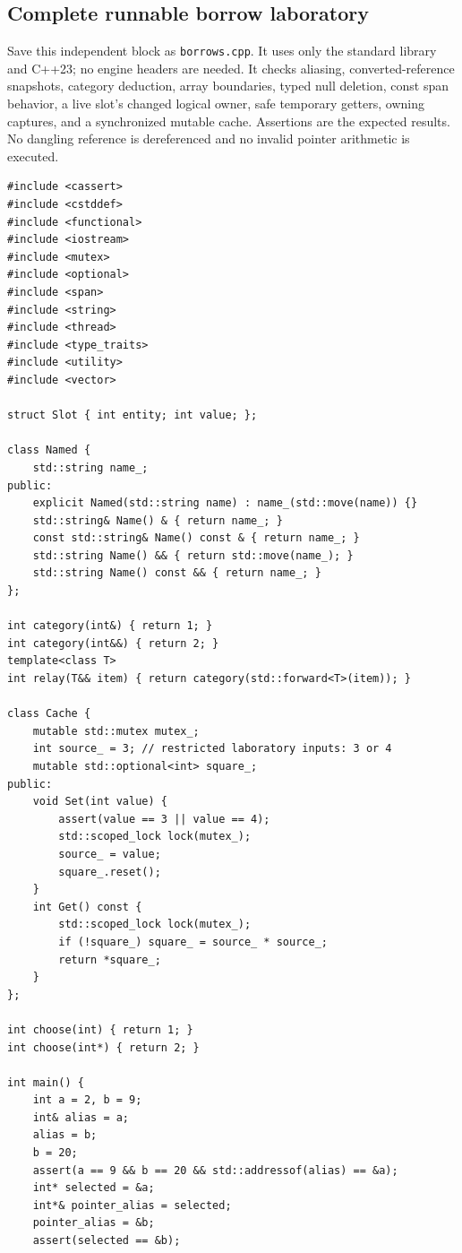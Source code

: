 \subsection{Complete runnable borrow laboratory}\label{01-foundations-i-ch004-complete-runnable-borrow-laboratory}

Save this independent block as \texttt{borrows.cpp}. It uses only the standard library and C++23; no engine headers are needed. It checks aliasing, converted-reference snapshots, category deduction, array boundaries, typed null deletion, const span behavior, a live slot's changed logical owner, safe temporary getters, owning captures, and a synchronized mutable cache. Assertions are the expected results. No dangling reference is dereferenced and no invalid pointer arithmetic is executed.

\begin{verbatim}
#include <cassert>
#include <cstddef>
#include <functional>
#include <iostream>
#include <mutex>
#include <optional>
#include <span>
#include <string>
#include <thread>
#include <type_traits>
#include <utility>
#include <vector>

struct Slot { int entity; int value; };

class Named {
    std::string name_;
public:
    explicit Named(std::string name) : name_(std::move(name)) {}
    std::string& Name() & { return name_; }
    const std::string& Name() const & { return name_; }
    std::string Name() && { return std::move(name_); }
    std::string Name() const && { return name_; }
};

int category(int&) { return 1; }
int category(int&&) { return 2; }
template<class T>
int relay(T&& item) { return category(std::forward<T>(item)); }

class Cache {
    mutable std::mutex mutex_;
    int source_ = 3; // restricted laboratory inputs: 3 or 4
    mutable std::optional<int> square_;
public:
    void Set(int value) {
        assert(value == 3 || value == 4);
        std::scoped_lock lock(mutex_);
        source_ = value;
        square_.reset();
    }
    int Get() const {
        std::scoped_lock lock(mutex_);
        if (!square_) square_ = source_ * source_;
        return *square_;
    }
};

int choose(int) { return 1; }
int choose(int*) { return 2; }

int main() {
    int a = 2, b = 9;
    int& alias = a;
    alias = b;
    b = 20;
    assert(a == 9 && b == 20 && std::addressof(alias) == &a);
    int* selected = &a;
    int*& pointer_alias = selected;
    pointer_alias = &b;
    assert(selected == &b);


\end{verbatim}
